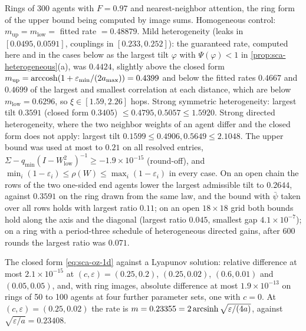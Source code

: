 \begin{numcheck}\label{chk:sca-heterogeneous}
Rings of 300 agents with $F=0.97$ and nearest-neighbor attention, the ring form of the upper bound being computed by image sums. Homogeneous control: $m_{\mathrm{up}}=m_{\mathrm{low}}=$ fitted rate $=0.48879$. Mild heterogeneity (leaks in $[0.0495,0.0591]$, couplings in $[0.233,0.252]$): the guaranteed rate, computed here and in the cases below as the largest tilt $\varphi$ with $\Psi(\varphi)<1$ in \cref{prop:sca-heterogeneous}(a), was $0.4424$, slightly above the closed form $m_{\mathrm{up}}=\operatorname{arccosh}(1+\varepsilon_{\min}/(2a_{\max}))=0.4399$ and below the fitted rates $0.4667$ and $0.4699$ of the largest and smallest correlation at each distance, which are below $m_{\mathrm{low}}=0.6296$, so $\xi\in[1.59,2.26]$ hops. Strong symmetric heterogeneity: largest tilt $0.3591$ (closed form $0.3405$) $\le0.4795,0.5057\le1.5920$. Strong directed heterogeneity, where the two neighbor weights of an agent differ and the closed form does not apply: largest tilt $0.1599\le0.4906,0.5649\le2.1048$. The upper bound was used at most to $0.21$ on all resolved entries, $\Sigma-q_{\min}(I-W_{\mathrm{low}}^2)^{-1}\ge-1.9\times10^{-15}$ (round-off), and $\min_i(1-\varepsilon_i)\le\rho(W)\le\max_i(1-\varepsilon_i)$ in every case. On an open chain the rows of the two one-sided end agents lower the largest admissible tilt to $0.2644$, against $0.3591$ on the ring drawn from the same law, and the bound with $\bar\psi$ taken over all rows holds with largest ratio $0.11$; on an open $18\times18$ grid both bounds hold along the axis and the diagonal (largest ratio $0.045$, smallest gap $4.1\times10^{-7}$); on a ring with a period-three schedule of heterogeneous directed gains, after 600 rounds the largest ratio was $0.071$.
\end{numcheck}

\begin{numcheck}\label{chk:sca-oz-ring}
The closed form \eqref{eq:sca-oz-1d} against a Lyapunov solution: relative difference at most $2.1\times10^{-15}$ at $(c,\varepsilon)=(0.25,0.2)$, $(0.25,0.02)$, $(0.6,0.01)$ and $(0.05,0.05)$, and, with ring images, absolute difference at most $1.9\times10^{-13}$ on rings of 50 to 100 agents at four further parameter sets, one with $c=0$. At $(c,\varepsilon)=(0.25,0.02)$ the rate is $m=0.23355=2\operatorname{arcsinh}\sqrt{\varepsilon/(4a)}$, against $\sqrt{\varepsilon/a}=0.23408$.
\end{numcheck}

